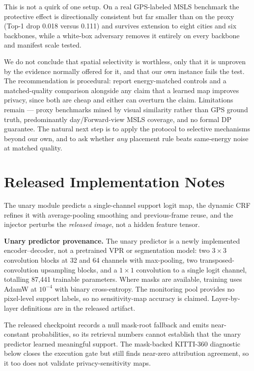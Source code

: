 \documentclass[10pt,journal]{IEEEtran}
\begin{document}
This is not a quirk of one setup. On a real GPS-labeled MSLS benchmark the
protective effect is directionally consistent but far smaller than on the
proxy (Top-1 drop 0.018 versus 0.111) and survives extension to eight cities
and six backbones, while a white-box adversary removes it entirely on every
backbone and manifest scale tested.

We do not conclude that spatial selectivity is worthless, only that it is
unproven by the evidence normally offered for it, and that our own instance
fails the test. The recommendation is procedural: report energy-matched
controls and a matched-quality comparison alongside any claim that a learned
map improves privacy, since both are cheap and either can overturn the claim.
Limitations remain --- proxy benchmarks mined by visual similarity rather than
GPS ground truth, predominantly day/Forward-view MSLS coverage, and no formal
DP guarantee. The natural next step is to apply the protocol to selective
mechanisms beyond our own, and to ask whether \emph{any} placement rule beats
same-energy noise at matched quality.


\appendices
\section{Released Implementation Notes}
The unary module predicts a single-channel support logit map, the dynamic CRF
refines it with average-pooling smoothing and previous-frame reuse, and the
injector perturbs the \emph{released image}, not a hidden feature tensor.

\textbf{Unary predictor provenance.} The unary predictor is a newly
implemented encoder--decoder, not a pretrained VPR or segmentation model: two
$3\times3$ convolution blocks at 32 and 64 channels with max-pooling, two
transposed-convolution upsampling blocks, and a $1\times1$ convolution to a
single logit channel, totalling 87,441 trainable parameters. Where masks are
available, training uses AdamW at $10^{-4}$ with binary cross-entropy. The
monitoring pool provides no pixel-level support labels, so no sensitivity-map
accuracy is claimed. Layer-by-layer definitions are in the released artifact.

The released checkpoint records a null mask-root fallback and emits
near-constant probabilities, so its retrieval numbers cannot establish that
the unary predictor learned meaningful support. The mask-backed KITTI-360 diagnostic below closes the
execution gate but still finds near-zero attribution agreement, so it too does
not validate privacy-sensitivity maps.
\end{document}
